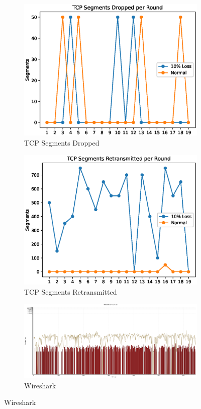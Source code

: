 \documentclass[12pt]{article}
\begin{document}
\begin{figure}
\begin{subfigure}[b]{.475\linewidth}
  \includegraphics[width=\linewidth]{tcp-dropped}
  \caption{TCP Segments Dropped}
  \label{fig:tcp-dropped}
\end{subfigure}\hfill
\begin{subfigure}[b]{.475\linewidth}
  \includegraphics[width=\linewidth]{tcp-rexmit}
  \caption{TCP Segments Retransmitted}
  \label{fig:tcp-rexmit}
\end{subfigure}

\begin{subfigure}[b]{\linewidth}
  \includegraphics[width=\linewidth]{wireshark}
  \caption{Wireshark}
  \label{fig:wireshark}
\end{subfigure}
\end{figure}
\end{document}
